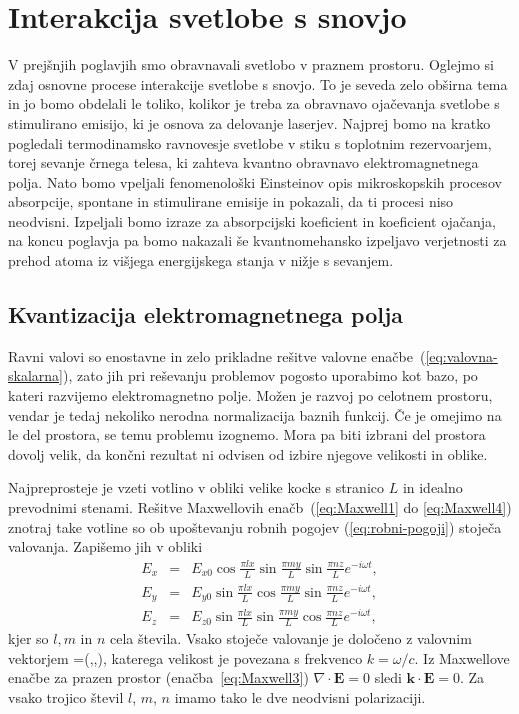 \chapter{Interakcija svetlobe s snovjo}

V prejšnjih poglavjih smo obravnavali svetlobo v praznem prostoru. Oglejmo si
zdaj osnovne procese interakcije svetlobe s snovjo. To je seveda zelo
obširna tema in jo bomo obdelali le toliko, kolikor je treba za
obravnavo ojačevanja svetlobe s stimulirano emisijo, ki je osnova za
delovanje laserjev. Najprej bomo na kratko pogledali termodinamsko ravnovesje 
svetlobe v stiku s toplotnim rezervoarjem, torej sevanje črnega telesa, ki 
zahteva kvantno obravnavo elektromagnetnega polja. Nato bomo vpeljali fenomenološki
Einsteinov opis mikroskopskih procesov absorpcije, spontane in stimulirane
emisije in pokazali, da ti procesi niso neodvisni. Izpeljali bomo
izraze za absorpcijski koeficient in koeficient ojačanja, na koncu poglavja
pa bomo nakazali še kvantnomehansko izpeljavo verjetnosti za prehod
atoma iz višjega energijskega stanja v nižje s sevanjem.

\section{Kvantizacija elektromagnetnega polja}

Ravni valovi so enostavne in zelo prikladne rešitve valovne 
enačbe~(\ref{eq:valovna-skalarna}), zato jih pri reševanju problemov pogosto uporabimo kot 
bazo, po kateri razvijemo elektromagnetno polje. Možen je razvoj
po celotnem prostoru, vendar je tedaj nekoliko nerodna normalizacija baznih
funkcij. Če je omejimo na le del prostora, se temu problemu izognemo. Mora pa biti 
izbrani del prostora dovolj velik, da končni rezultat ni odvisen od izbire 
njegove velikosti in oblike.


Najpreprosteje je vzeti votlino v obliki velike kocke s stranico
$L$ in idealno prevodnimi stenami. Rešitve Maxwellovih enačb~(\ref{eq:Maxwell1} do \ref{eq:Maxwell4}) 
znotraj take votline so ob upoštevanju robnih pogojev (\ref{eq:robni-pogoji}) 
stoječa valovanja. Zapišemo jih v obliki
\begin{eqnarray}
E_{x} & = & E_{x0}\cos\frac{\pi lx}{L}\sin\frac{\pi my}{L}\sin\frac{\pi nz}{L}e^{-i\omega t},\nonumber \\
E_{y} & = & E_{y0}\sin\frac{\pi lx}{L}\cos\frac{\pi my}{L}\sin\frac{\pi nz}{L}e^{-i\omega t},\nonumber \\
E_{z} & = & E_{z0}\sin\frac{\pi lx}{L}\sin\frac{\pi my}{L}\cos\frac{\pi nz}{L}e^{-i\omega t},
\label{eq:stojece_votlina}
\end{eqnarray}
kjer so $l,m$ in $n$ cela števila. Vsako stoječe valovanje je določeno z valovnim 
vektorjem 
\beq
{}=\left(,,\right),
\eeq 
katerega velikost je povezana s frekvenco $k = \omega/c$.
Iz Maxwellove enačbe za prazen prostor (enačba~\ref{eq:Maxwell3}) 
$\nabla\cdot\mathbf{E}=0$ sledi $\mathbf{k}\cdot\mathbf{E}=0$. 
Za vsako trojico števil $l$, $m$, $n$ imamo tako le dve
neodvisni polarizaciji.

